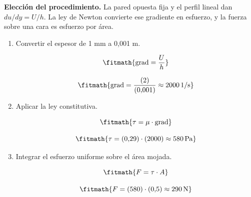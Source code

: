 \noindent\textbf{Elección del procedimiento.} La pared opuesta fija y el perfil lineal dan $du/dy=U/h$. La ley de Newton convierte ese gradiente en esfuerzo, y la fuerza sobre una cara es esfuerzo por área.

\begin{enumerate}

\item Convertir el espesor de 1 mm a 0,001 m.

\[\fitmath{\mathrm{grad}=\frac{U}{h}}\]

\[\fitmath{\mathrm{grad}=\frac{(2)}{(0{,}001)}\approx 2000\,\mathrm{1/s}}\]

\item Aplicar la ley constitutiva.

\[\fitmath{\tau=\mu\cdot \mathrm{grad}}\]

\[\fitmath{\tau=(0{,}29)\cdot (2000)\approx 580\,\mathrm{Pa}}\]

\item Integrar el esfuerzo uniforme sobre el área mojada.

\[\fitmath{F=\tau\cdot A}\]

\[\fitmath{F=(580)\cdot (0{,}5)\approx 290\,\mathrm{N}}\]

\end{enumerate}
